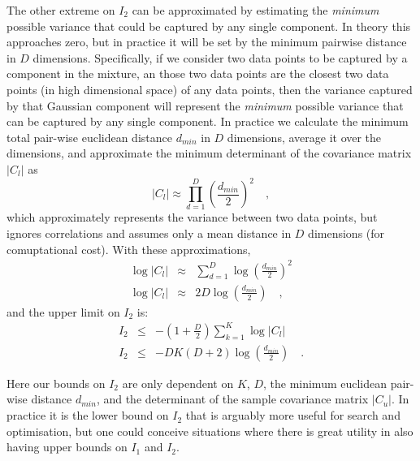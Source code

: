 \documentclass{elsarticle}
\def\cov{C}
\begin{document}
The other extreme on $I_2$ can be approximated by estimating the \emph{minimum}
possible variance that could be captured by any single component. In theory
this approaches zero, but in practice it will be set by the minimum pairwise
distance in $D$ dimensions. Specifically, if we consider two data points to be
captured by a component in the mixture, an those two data points are the
closest two data points (in high dimensional space) of any data points, then
the variance captured by that Gaussian component will represent the \emph{minimum}
possible variance that can be captured by any single component.  
In practice we calculate the minimum total pair-wise euclidean distance $d_{min}$
in $D$ dimensions, average it over the dimensions, and approximate the minimum
determinant of the covariance matrix $|\cov_l|$ as
\begin{equation}
    |\cov_{l}| \approx \prod_{d=1}^{D}\left(\frac{d_{min}}{2}\right)^2 \quad ,
\end{equation}
\noindent{}which approximately represents the variance between two data points,
but ignores correlations and assumes only a mean distance in $D$ dimensions
(for comuptational cost). With these approximations,
\begin{eqnarray}
    \log{|\cov_{l}|} & \approx & \sum_{d=1}^{D}\log{\left(\frac{d_{min}}{2}\right)^2}  \nonumber \\
    \log{|\cov_{l}|} & \approx & 2D\log{\left(\frac{d_{min}}{2}\right)} \quad ,
\end{eqnarray}
\noindent{}and the upper limit on $I_2$ is:
\begin{eqnarray}
    I_{2} & \leq & -\left(1 + \frac{D}{2}\right)\sum_{k=1}^{K}\log{|\cov_l|} \nonumber \\
    I_{2} & \leq & -DK\left(D+2\right)\log{\left(\frac{d_{min}}{2}\right)} \quad .
\end{eqnarray}

Here our bounds on $I_2$ are only dependent on $K$, $D$, the minimum euclidean
pair-wise distance $d_{min}$, and the determinant of the sample covariance
matrix $|\cov_u|$. In practice it is the lower bound on $I_{2}$ that is 
arguably more useful for search and optimisation, but one could conceive
situations where there is great utility in also having upper bounds on $I_1$
and $I_2$.
\end{document}
